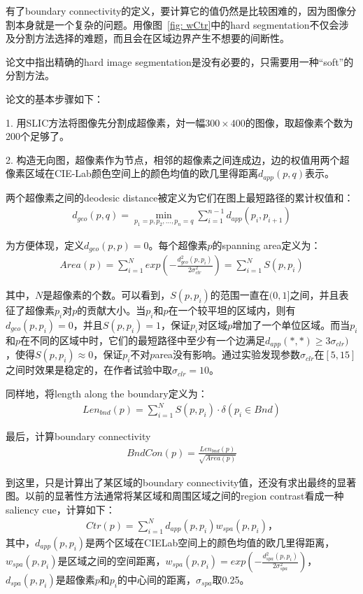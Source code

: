 \documentclass[12pt]{article}
\begin{document}
有了boundary connectivity的定义，要计算它的值仍然是比较困难的，因为图像分割本身就是一个复杂的问题。用像图~\ref{fig: wCtr}中的hard segmentation不仅会涉及分割方法选择的难题，而且会在区域边界产生不想要的间断性。

论文中指出精确的hard image segmentation是没有必要的，只需要用一种“soft”的分割方法。

论文的基本步骤如下：

1. 用SLIC方法将图像先分割成超像素，対一幅$300 \times 400$的图像，取超像素个数为200个足够了。

2. 构造无向图，超像素作为节点，相邻的超像素之间连成边，边的权值用两个超像素区域在CIE-Lab颜色空间上的颜色均值的欧几里得距离$d_{app}(p, q)$表示。

两个超像素之间的deodesic distance被定义为它们在图上最短路径的累计权值和：
\begin{align}
d_{geo}(p, q) = \min_{p_1=p, p_2, \ldots, p_n=q}\sum_{i=1}^{n-1}d_{app}(p_i, p_{i+1})
\end{align}

为方便体现，定义$d_{geo}(p, p) = 0$。每个超像素$p$的spanning area定义为：
\begin{align}
Area(p) = \sum_{i=1}^N exp(-\frac{d_{geo}^2(p, p_i)}{2\sigma_{clr}^2})=\sum_{i=1}^N S(p, p_i)
\end{align}

其中，$N$是超像素的个数。可以看到，$S(p, p_i)$的范围一直在$(0, 1]$之间，并且表征了超像素$p_i$对$p$的贡献大小。当$p_i$和$p$在一个较平坦的区域内，则有$d_{geo}(p, p_i) = 0$，并且$S(p, p_i) =1$，保证$p_i$对区域$p$增加了一个单位区域。而当$p_i$和$p$在不同的区域中时，它们的最短路径中至少有一个边满足$d_{app}(*, *)\ge 3\sigma_{clr})$，使得$S(p, p_i)\approx0$，保证$p_i$不对$p$area没有影响。通过实验发现参数$\sigma_{clr}$在$[5,15]$之间时效果是稳定的，在作者试验中取$\sigma_{clr}=10$。

同样地，将length along the boundary定义为：
\begin{align}
Len_{bnd}(p) = \sum_{i=1}^N S(p, p_i) \cdot \delta(p_i \in Bnd)
\end{align}

最后，计算boundary connectivity
\begin{align}
BndCon(p) = \frac{Len_{bnd}(p)}{\sqrt{Area(p)}}
\end{align}

到这里，只是计算出了某区域的boundary connectivity值，还没有求出最终的显著图。以前的显著性方法通常将某区域和周围区域之间的region contrast看成一种saliency cue，计算如下：
\begin{align}
Ctr(p) = \sum_{i=1}^{N}d_{app}(p, p_i)w_{spa}(p, p_i)，
\end{align}
其中，$d_{app}(p, p_i)$是两个区域在CIELab空间上的颜色均值的欧几里得距离，$w_{spa}(p, p_i)$是区域之间的空间距离，$w_{spa}(p, p_i) = exp(-\frac{d_{spa}^2(p, p_i)}{2\sigma_{spa}^2})$，$d_{spa}(p, p_i)$是超像素$p$和$p_i$的中心间的距离，$\sigma_{spa}$取0.25。
\end{document}
